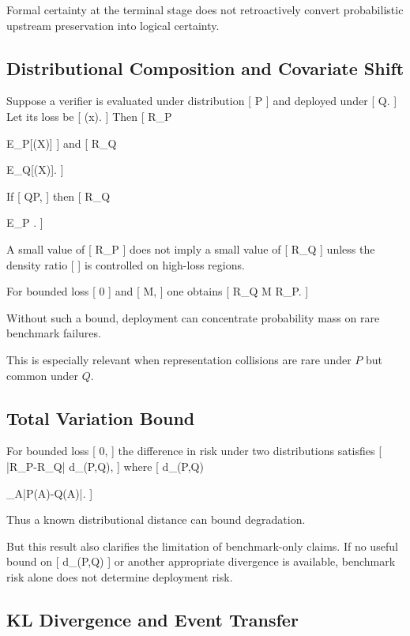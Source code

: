 \documentclass[11pt]{article}
\begin{document}
Formal certainty at the terminal stage does not retroactively convert probabilistic upstream preservation into logical certainty.

\subsection{Distributional Composition and Covariate Shift}

Suppose a verifier is evaluated under distribution
[
P
]
and deployed under
[
Q.
]
Let its loss be
[
\ell(x).
]
Then
[
R_P

\mathbb E_P[\ell(X)]
]
and
[
R_Q

\mathbb E_Q[\ell(X)].
]

If
[
Q\ll P,
]
then
[
R_Q

\mathbb E_P
.
]

A small value of
[
R_P
]
does not imply a small value of
[
R_Q
]
unless the density ratio
[
]
is controlled on high-loss regions.

For bounded loss
[
0\leq\ell{}
]
and
[
\leq M,
]
one obtains
[
R_Q
\leq
M R_P.
]

Without such a bound, deployment can concentrate probability mass on rare benchmark failures.

This is especially relevant when representation collisions are rare under $P$ but common under $Q$.

\subsection{Total Variation Bound}

For bounded loss
[
0\leq\ell{},
]
the difference in risk under two distributions satisfies
[
|R_P-R_Q|
\leq
d_{}(P,Q),
]
where
[
d_{}(P,Q)

\sup_A|P(A)-Q(A)|.
]

Thus a known distributional distance can bound degradation.

But this result also clarifies the limitation of benchmark-only claims. If no useful bound on
[
d_{}(P,Q)
]
or another appropriate divergence is available, benchmark risk alone does not determine deployment risk.

\subsection{KL Divergence and Event Transfer}
\end{document}
